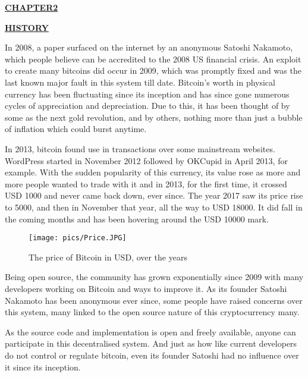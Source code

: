 \documentclass[12pt,a4paper]{report}
\begin{document}
\begin{flushleft}
\newpage
\begin{center}\underline{  \Large\textbf{CHAPTER2}}\end{center}
\begin{center}\underline{ \Large \textbf{HISTORY}}\end{center}


\vspace{10mm}
In 2008, a paper surfaced on the internet by an anonymous Satoshi Nakamoto, which people believe can be accredited to the 2008 US financial crisis. An exploit to create many bitcoins did occur in 2009, which was promptly fixed and was the last known major fault in this system till date. Bitcoin's worth in physical currency has been fluctuating since its inception and has since gone numerous cycles of appreciation and depreciation.
Due to this, it has been thought of by some as the next gold revolution, and by others, nothing more than just a bubble of inflation which could burst anytime.
\vspace{5mm}

In 2013, bitcoin found use in transactions over some mainstream websites. WordPress started in November 2012 followed by OKCupid in April 2013, for example.
With the sudden popularity of this currency, its value rose as more and more people wanted to trade with it and in 2013, for the first time, it crossed USD 1000 and never came back down, ever since. The year 2017 saw its price rise to 5000, and then in November that year, all the way to USD 18000. It did fall in the coming months and has been hovering around the USD 10000 mark.


\begin{figure}[h]
\centering
\caption{The price of Bitcoin in USD, over the years}
\texttt{[image: pics/Price.JPG]}
\end{figure}

\vspace{10mm}
Being open source, the community has grown exponentially since 2009 with many developers working on Bitcoin and ways to improve it. As its founder Satoshi Nakamoto has been anonymous ever since, some people have raised concerns over this system, many linked to the open source nature of this cryptocurrency many.

As the source code and implementation is open and freely available, anyone can participate in this decentralised system. And just as how like current developers do not control or regulate bitcoin, even its founder Satoshi had no influence over it since its inception.


\end{flushleft}
\end{document}
